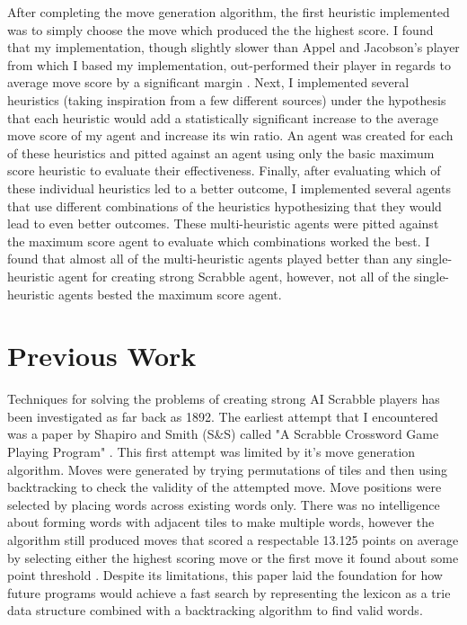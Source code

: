 \documentclass[letterpaper]{article}
\begin{document}
After completing the move generation algorithm, the first heuristic implemented was to simply choose the move which produced the the highest score. I found that my implementation, though slightly slower than Appel and Jacobson's player from which I based my implementation, out-performed their player in regards to average move score by a significant margin \cite{Appel1988}. Next, I implemented several heuristics (taking inspiration from a few different sources) under the hypothesis that each heuristic would add a statistically significant increase to the average move score of my agent and increase its win ratio. An agent was created for each of these heuristics and pitted against an agent using only the basic maximum score heuristic to evaluate their effectiveness. Finally, after evaluating which of these individual heuristics led to a better outcome, I implemented several agents that use different combinations of the heuristics hypothesizing that they would lead to even better outcomes. These multi-heuristic agents were pitted against the maximum score agent to evaluate which combinations worked the best. I found that almost all of the multi-heuristic agents played better than any single-heuristic agent for creating strong Scrabble agent, however, not all of the single-heuristic agents bested the maximum score agent.

\section{Previous Work}
Techniques for solving the problems of creating strong AI Scrabble players has been investigated as far back as 1892. The earliest attempt that I encountered was a paper by Shapiro and Smith (S\&S) called "A Scrabble Crossword Game Playing Program" \cite{Shapiro1982}. This first attempt was limited by it's move generation algorithm. Moves were generated by trying permutations of tiles and then using backtracking to check the validity of the attempted move. Move positions were selected by placing words across existing words only. There was no intelligence about forming words with adjacent tiles to make multiple words, however the algorithm still produced moves that scored a respectable 13.125 points on average by selecting either the highest scoring move or the first move it found about some point threshold \cite{Shapiro1982}. Despite its limitations, this paper laid the foundation for how future programs would achieve a fast search by representing the lexicon as a trie data structure combined with a backtracking algorithm to find valid words.
\end{document}
